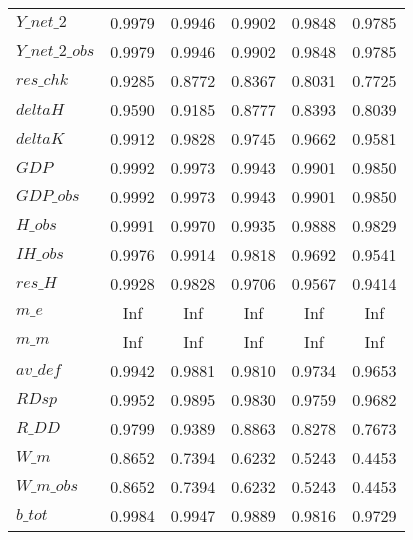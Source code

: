 \begin{center}
\begin{longtable}{lccccc}
$Y\_net\_2                  $	 & 	    0.9979	 & 	    0.9946	 & 	    0.9902	 & 	    0.9848	 & 	    0.9785 \\ 
$Y\_net\_2\_obs             $	 & 	    0.9979	 & 	    0.9946	 & 	    0.9902	 & 	    0.9848	 & 	    0.9785 \\ 
$res\_chk                   $	 & 	    0.9285	 & 	    0.8772	 & 	    0.8367	 & 	    0.8031	 & 	    0.7725 \\ 
$deltaH                     $	 & 	    0.9590	 & 	    0.9185	 & 	    0.8777	 & 	    0.8393	 & 	    0.8039 \\ 
$deltaK                     $	 & 	    0.9912	 & 	    0.9828	 & 	    0.9745	 & 	    0.9662	 & 	    0.9581 \\ 
$GDP                        $	 & 	    0.9992	 & 	    0.9973	 & 	    0.9943	 & 	    0.9901	 & 	    0.9850 \\ 
$GDP\_obs                   $	 & 	    0.9992	 & 	    0.9973	 & 	    0.9943	 & 	    0.9901	 & 	    0.9850 \\ 
$H\_obs                     $	 & 	    0.9991	 & 	    0.9970	 & 	    0.9935	 & 	    0.9888	 & 	    0.9829 \\ 
$IH\_obs                    $	 & 	    0.9976	 & 	    0.9914	 & 	    0.9818	 & 	    0.9692	 & 	    0.9541 \\ 
$res\_H                     $	 & 	    0.9928	 & 	    0.9828	 & 	    0.9706	 & 	    0.9567	 & 	    0.9414 \\ 
$m\_e                       $	 & 	       Inf	 & 	       Inf	 & 	       Inf	 & 	       Inf	 & 	       Inf \\ 
$m\_m                       $	 & 	       Inf	 & 	       Inf	 & 	       Inf	 & 	       Inf	 & 	       Inf \\ 
$av\_def                    $	 & 	    0.9942	 & 	    0.9881	 & 	    0.9810	 & 	    0.9734	 & 	    0.9653 \\ 
$RDsp                       $	 & 	    0.9952	 & 	    0.9895	 & 	    0.9830	 & 	    0.9759	 & 	    0.9682 \\ 
$R\_DD                      $	 & 	    0.9799	 & 	    0.9389	 & 	    0.8863	 & 	    0.8278	 & 	    0.7673 \\ 
$W\_m                       $	 & 	    0.8652	 & 	    0.7394	 & 	    0.6232	 & 	    0.5243	 & 	    0.4453 \\ 
$W\_m\_obs                  $	 & 	    0.8652	 & 	    0.7394	 & 	    0.6232	 & 	    0.5243	 & 	    0.4453 \\ 
$b\_tot                     $	 & 	    0.9984	 & 	    0.9947	 & 	    0.9889	 & 	    0.9816	 & 	    0.9729 \\ 

\end{longtable}
\end{center}
